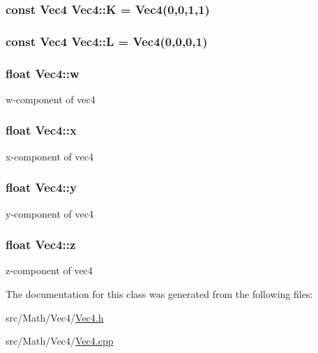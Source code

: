 \subsubsection[{\texorpdfstring{K}{K}}]{\setlength{\rightskip}{0pt plus 5cm}const {\bf Vec4} Vec4\+::K = {\bf Vec4}(0,0,1,1)\hspace{0.3cm}{\ttfamily [static]}}\hypertarget{class_vec4_addeaf426d9bc1652437910579bac60a7}{}\label{class_vec4_addeaf426d9bc1652437910579bac60a7}
\subsubsection[{\texorpdfstring{L}{L}}]{\setlength{\rightskip}{0pt plus 5cm}const {\bf Vec4} Vec4\+::L = {\bf Vec4}(0,0,0,1)\hspace{0.3cm}{\ttfamily [static]}}\hypertarget{class_vec4_a448e9112941328b5eac24ca623e97295}{}\label{class_vec4_a448e9112941328b5eac24ca623e97295}
\subsubsection[{\texorpdfstring{w}{w}}]{\setlength{\rightskip}{0pt plus 5cm}float Vec4\+::w}\hypertarget{class_vec4_a37bee38ceffb78ccd3875ebf82bd84b2}{}\label{class_vec4_a37bee38ceffb78ccd3875ebf82bd84b2}
w-\/component of vec4 
\subsubsection[{\texorpdfstring{x}{x}}]{\setlength{\rightskip}{0pt plus 5cm}float Vec4\+::x}\hypertarget{class_vec4_a3d9a7d18ac661965798b0c5bc32c56df}{}\label{class_vec4_a3d9a7d18ac661965798b0c5bc32c56df}
x-\/component of vec4 
\subsubsection[{\texorpdfstring{y}{y}}]{\setlength{\rightskip}{0pt plus 5cm}float Vec4\+::y}\hypertarget{class_vec4_a21c69aa0ef01a4ea985966c5527bbd69}{}\label{class_vec4_a21c69aa0ef01a4ea985966c5527bbd69}
y-\/component of vec4 
\subsubsection[{\texorpdfstring{z}{z}}]{\setlength{\rightskip}{0pt plus 5cm}float Vec4\+::z}\hypertarget{class_vec4_a60d0b599c7104dd0c6e2ae0cc4cd0310}{}\label{class_vec4_a60d0b599c7104dd0c6e2ae0cc4cd0310}
z-\/component of vec4 

The documentation for this class was generated from the following files\+:\begin{DoxyCompactItemize}
\item 
src/\+Math/\+Vec4/\hyperlink{_vec4_8h}{Vec4.\+h}\item 
src/\+Math/\+Vec4/\hyperlink{_vec4_8cpp}{Vec4.\+cpp}\end{DoxyCompactItemize}
